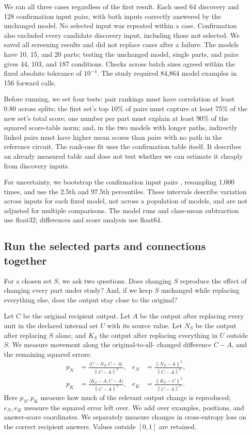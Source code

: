 \documentclass[11pt,letterpaper]{article}
\newcommand{\norm}[1]{\left\lVert#1\right\rVert}
\begin{document}
We ran all three cases regardless of the first result. Each used 64 discovery
and 128 confirmation input pairs, with both inputs correctly answered by the
unchanged model. No selected input was repeated within a case. Confirmation
also excluded every candidate discovery input, including those not selected.
We saved all screening results and did not replace cases after a failure.
The models have 10, 15, and 20 parts; testing the unchanged model, single parts,
and pairs gives 44, 103, and 187 conditions. Checks across batch sizes agreed
within the fixed absolute tolerance of $10^{-4}$. The study required 84,864
model examples in 156 forward calls.

Before running, we set four tests: pair rankings must have correlation at least
0.80 across splits; the first set's top 10\% of pairs must capture at least
75\% of the new set's total score; one number per part must explain at least
90\% of the squared score-table norm; and, in the two models with longer
paths, indirectly linked pairs must have higher mean scores than pairs with
no path in the reference circuit. The rank-one fit uses the confirmation
table itself. It describes an already measured table and does not test whether
we can estimate it cheaply from discovery inputs.

For uncertainty, we bootstrap the confirmation input pairs
\cite{efron1979bootstrap}, resampling 1,000 times, and use
the 2.5th and 97.5th percentiles. These intervals describe variation across
inputs for each fixed model, not across a population of models, and are not
adjusted for multiple comparisons. The model runs and class-mean subtraction
use float32; differences and score analysis use float64.

\subsection*{Run the selected parts and connections together}
For a chosen set $S$, we ask two questions. Does changing $S$ reproduce the
effect of changing every part under study? And, if we keep $S$ unchanged while
replacing everything else, does the output stay close to the original?

Let $C$ be the original recipient output. Let $A$ be the output after replacing
every unit in the declared internal set $U$ with its source value. Let $N_S$
be the output after replacing $S$ alone, and $K_S$ the output after replacing
everything in $U$ outside $S$. We measure movement along the original-to-all-
changed difference $C-A$, and the remaining squared errors:
\begin{align}
 p_N &= \frac{\langle C-N_S,C-A\rangle}{\norm{C-A}^2}, &
 e_N &= \frac{\norm{N_S-A}^2}{\norm{C-A}^2},\\
 p_K &= \frac{\langle K_S-A,C-A\rangle}{\norm{C-A}^2}, &
 e_K &= \frac{\norm{K_S-C}^2}{\norm{C-A}^2}.
\end{align}
Here $p_N,p_K$ measure how much of the relevant output change is reproduced;
$e_N,e_K$ measure the squared error left over. We add over examples, positions,
and answer-score coordinates. We separately measure changes in cross-entropy
loss on the correct recipient answers. Values outside $[0,1]$ are retained.
\end{document}
